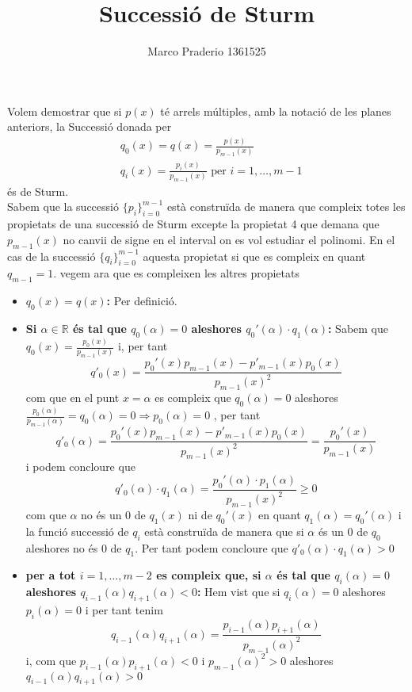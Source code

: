 \documentclass[a4paper,10pt]{article}
\title{Successió de Sturm}
\author{Marco Praderio 1361525}
\date{}
\renewcommand{\*}{\cdot}
\renewcommand{\a}{\alpha}
\renewcommand{\r}{\mathbb{R}}
\begin{document}
 \maketitle
 Volem demostrar que si $p(x)$ té arrels múltiples, amb la notació de les planes anteriors, la Successió donada per
 \begin{equation*}
 \begin{split}
  &q_0(x)=q(x)=\frac{p(x)}{p_{m-1}(x)}\\
  &q_i(x)=\frac{p_i(x)}{p_{m-1}(x)}\text{ per }i=1,\dots,m-1
 \end{split}
\end{equation*}
és de Sturm.\\
Sabem que la successió $\{p_i\}_{i=0}^{m-1}$ està construïda de manera que compleix totes les propietats de una successió de Sturm excepte la propietat 4 que demana que
$p_{m-1}(x)$ no canvii de signe en el interval on es vol estudiar el polinomi. En el cas de la successió $\{q_i\}_{i=0}^{m-1}$ aquesta propietat si que es compleix en quant
$q_{m-1}=1$. vegem ara que es compleixen les altres propietats
\begin{itemize}
\item \textbf{$q_0(x)=q(x)$:} Per definició.
 \item \textbf{Si $\a\in\r$ és tal que $q_0(\a)=0$ aleshores $q_0'(\a)\*q_1(\a)$:} Sabem que $q_0(x)=\frac{p_0(x)}{p_{m-1}(x)}$ i, per tant
 $$q'_0(x)=\frac{p_0'(x)p_{m-1}(x)-p'_{m-1}(x)p_0(x)}{p_{m-1}(x)^2}$$
 com que en el punt $x=\a$ es compleix que $q_0(\a)=0$ aleshores $\frac{p_0(\a)}{p_{m-1}(\a)}=q_0(\a)=0 \Rightarrow p_0(\a)=0$ , per tant
 $$q'_0(\a)=\frac{p_0'(x)p_{m-1}(x)-p'_{m-1}(x)p_0(x)}{p_{m-1}(x)^2}=\frac{p_0'(x)}{p_{m-1}(x)}$$
 i podem concloure que $$q'_0(\a)\*q_1(\a)=\frac{p_0'(\a)\*p_1(\a)}{p_{m-1}(x)^2}\ge 0$$ com que $\a$ no és un 0 de $q_1(x)$ ni de $q_0'(x)$ en quant $q_1(\a)=q_0'(\a)$ i la
 funció successió de $q_i$ està construïda de manera que si $\a$ és un 0 de $q_0$ aleshores no és 0 de $q_1$. Per tant podem concloure que $q'_0(\a)\*q_1(\a)>0$
 \item \textbf{per a tot $i=1,\dots,m-2$ es compleix que, si $\a$ és tal que $q_i(\a)=0$ aleshores $q_{i-1}(\a)q_{i+1}(\a)<0$:} Hem vist que si $q_i(\a)=0$ aleshores
 $p_i(\a)=0$ i per tant tenim
 \begin{equation*}
  q_{i-1}(\a)q_{i+1}(\a)=\frac{p_{i-1}(\a)p_{i+1}(\a)}{p_{m-1}(\a)^2}
 \end{equation*}
 i, com que $p_{i-1}(\a)p_{i+1}(\a)<0$ i $p_{m-1}(\a)^2>0$ aleshores $q_{i-1}(\a)q_{i+1}(\a)>0$
\end{itemize}
\end{document}
